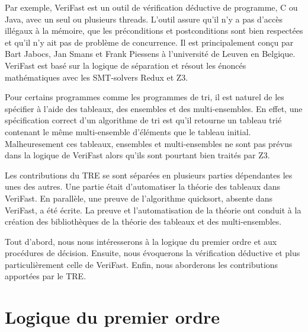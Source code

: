 \documentclass[11pt,openany]{article}
\newcommand{\verifast}{VeriFast}
\begin{document}
	Par exemple, \verifast{} est un outil de v\'erification d\'eductive de programme, C ou Java, avec un seul ou plusieurs threads. L'outil assure qu'il n'y a pas d'acc\`es ill\'egaux \`a la m\'emoire, que les pr\'econditions et postconditions sont bien respect\'ees et qu'il n'y ait pas de probl\`eme de concurrence. Il est principalement con\c{c}u par Bart Jabocs, Jan Smans et Frank Piessens \`a l'universit\'e de Leuven en Belgique. \verifast{} est bas\'e sur la logique de s\'eparation et r\'esout les \'enonc\'es math\'ematiques avec les SMT-solvers Redux et Z3.
	
	 Pour certains programmes comme les programmes de tri, il est naturel de les sp\'ecifier \`a l'aide des tableaux, des ensembles et des multi-ensembles. En effet, une sp\'ecification correct d'un algorithme de tri est qu'il retourne un tableau tri\'e contenant le m\^eme multi-ensemble d'\'el\'ements que le tableau initial. Malheuresement ces tableaux, ensembles et multi-ensembles ne sont pas pr\'evus dans la logique de \verifast{} alors qu'ils sont pourtant bien trait\'es par Z3.
	 
	 Les contributions du TRE se sont s\'epar\'ees en plusieurs parties d\'ependantes les unes des autres. Une partie \'etait d'automatiser la th\'eorie des tableaux dans \verifast. En parall\`ele, une preuve de l'algorithme quicksort, absente dans \verifast, a \'et\'e \'ecrite. La preuve et l'automatisation de la th\'eorie ont conduit \`a la cr\'eation des biblioth\`eques de la th\'eorie des tableaux et des multi-ensembles.
	 
	Tout d'abord, nous nous int\'eresserons \`a la logique du premier ordre et aux proc\'edures de d\'ecision. Ensuite, nous \'evoquerons la v\'erification d\'eductive et plus particuli\`erement celle de \verifast. Enfin, nous aborderons les contributions apport\'ees par le TRE.

\section{Logique du premier ordre}
\end{document}
